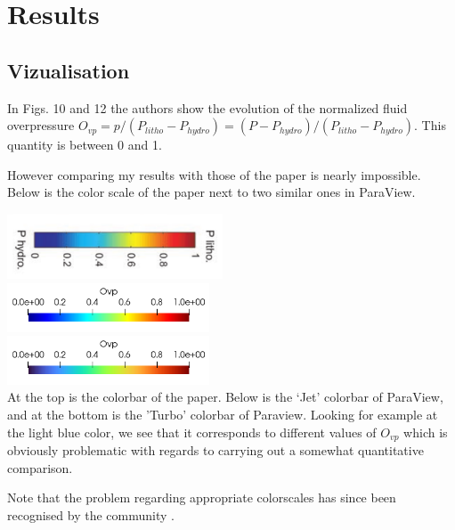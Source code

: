 \section*{Results}

\subsection*{Vizualisation}

In Figs. 10 and 12 the authors show the evolution of the
normalized fluid overpressure $O_{vp} = p/(P_{litho}-P_{hydro})= 
(P- P_{hydro})/(P_{litho} - P_{hydro})$. This quantity is between 0 and 1.

However comparing my results with those of the paper is nearly impossible. Below is the
color scale of the paper next to two similar ones in ParaView. 
\begin{center}
\includegraphics[width=6.4cm]{python_codes/fieldstone_126/images/grfr03_Ovp}\\
\includegraphics[width=6cm]{python_codes/fieldstone_126/images/jet}\\
\includegraphics[width=6cm]{python_codes/fieldstone_126/images/turbo}\\
{\captionfont At the top is the colorbar of the paper.
Below is the `Jet' colorbar of ParaView, and at the bottom is 
the 'Turbo' colorbar of Paraview. Looking for example at the light blue color, we see that 
it corresponds to different values of $O_{vp}$ which is obviously
problematic with regards to carrying out a somewhat quantitative comparison.}
\end{center}
Note that the problem regarding appropriate colorscales has since been 
recognised by the community \cite{crsh20}.

